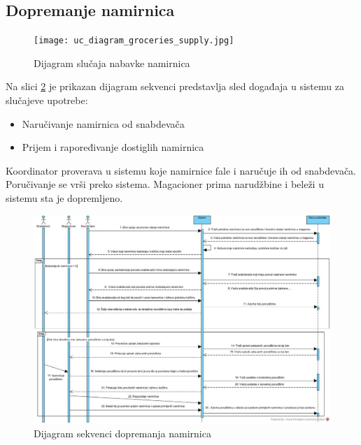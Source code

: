 \subsection{Dopremanje namirnica}
\begin{figure}[H]
\begin{center}
\texttt{[image: uc\_diagram\_groceries\_supply.jpg]}

    \caption{Dijagram slučaja nabavke namirnica}
    \end{center}
\label{fig:Uc_diagram_groceries_supply}
\end{figure}



Na slici \ref{fig:seqGroceryDelivery} je prikazan dijagram sekvenci predstavlja sled događaja u sistemu za slučajeve upotrebe: 
\begin{itemize}
	\item{Naručivanje namirnica od snabdevača}
	\item{Prijem i rapoređivanje dostiglih namirnica}
\end{itemize}

Koordinator proverava u sistemu koje namirnice fale i naručuje ih od snabdevača.
Poručivanje se vrši preko sistema. Magacioner prima narudžbine i beleži u sistemu sta je dopremljeno.


\begin{figure}[H]
	\begin{center}
		\includegraphics[width=\textwidth]{Pictures/seq_diagram_groceries_supply.jpg}
	\end{center}
    \caption{Dijagram sekvenci dopremanja namirnica}
\label{fig:seqGroceryDelivery}
\end{figure}